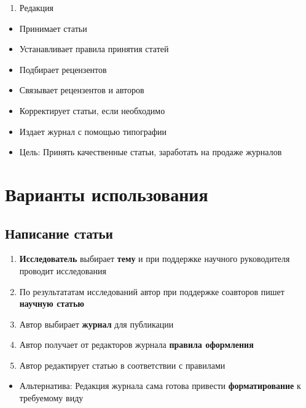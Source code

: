 \begin{enumerate}
\def\labelenumi{\arabic{enumi}.}
\setcounter{enumi}{2}
\tightlist
\item
  Редакция
\end{enumerate}

\begin{itemize}
\tightlist
\item
  Принимает статьи
\item
  Устанавливает правила принятия статей
\item
  Подбирает рецензентов
\item
  Связывает рецензентов и авторов
\item
  Корректирует статьи, если необходимо
\item
  Издает журнал с помощью типографии
\item
  Цель: Принять качественные статьи, заработать на продаже журналов
\end{itemize}

\section{Варианты
использования}\label{ux432ux430ux440ux438ux430ux43dux442ux44b-ux438ux441ux43fux43eux43bux44cux437ux43eux432ux430ux43dux438ux44f}

\subsection{Написание
статьи}\label{ux43dux430ux43fux438ux441ux430ux43dux438ux435-ux441ux442ux430ux442ux44cux438}

\begin{enumerate}
\def\labelenumi{\arabic{enumi}.}
\tightlist
\item
  \textbf{Исследователь} выбирает \textbf{тему} и при поддержке научного
  руководителя проводит исследования
\item
  По результататам исследований автор при поддержке соавторов пишет
  \textbf{научную статью}
\item
  Автор выбирает \textbf{журнал} для публикации
\item
  Автор получает от редакторов журнала \textbf{правила оформления}
\item
  Автор редактирует статью в соответствии с правилами
\end{enumerate}

\begin{itemize}
\tightlist
\item
  Альтернатива: Редакция журнала сама готова привести
  \textbf{форматирование} к требуемому виду
\end{itemize}

